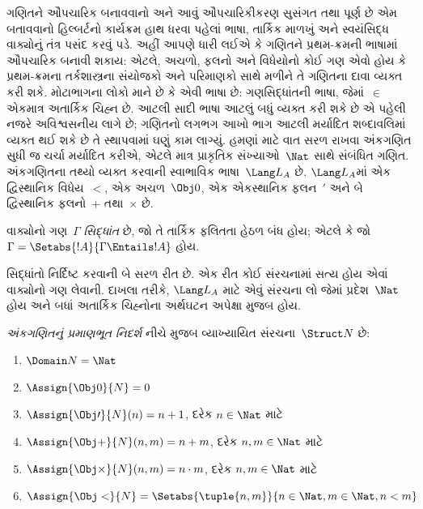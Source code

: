\label{guunit:OLP-0277}


ગણિતને ઔપચારિક બનાવવાનો અને આવું ઔપચારિકીકરણ
સુસંગત તથા પૂર્ણ છે એમ બતાવવાનો હિલ્બર્ટનો
કાર્યક્રમ હાથ ધરવા પહેલાં ભાષા, તાર્કિક માળખું
અને સ્વયંસિદ્ધ વાક્યોનું તંત્ર પસંદ કરવું પડે.
અહીં આપણે ધારી લઈએ કે ગણિતને પ્રથમ-ક્રમની
ભાષામાં ઔપચારિક બનાવી શકાય: એટલે, અચળો,
ફલનો અને વિધેયોનો કોઈ ગણ એવો
હોય કે પ્રથમ-ક્રમના તર્કશાસ્ત્રના સંયોજકો અને
પરિમાણકો સાથે મળીને તે ગણિતના દાવા વ્યક્ત
કરી શકે. મોટાભાગના લોકો માને છે કે એવી ભાષા
છે: ગણસિદ્ધાંતની ભાષા, જેમાં~$\in$ એકમાત્ર
અતાર્કિક ચિહ્ન છે. આટલી સાદી ભાષા આટલું બધું
વ્યક્ત કરી શકે છે એ પહેલી નજરે અવિશ્વસનીય
લાગે છે; ગણિતનો લગભગ આખો ભાગ આટલી
મર્યાદિત શબ્દાવલિમાં વ્યક્ત થઈ શકે છે તે
સ્થાપવામાં ઘણું કામ લાગ્યું. હમણાં માટે વાત
સરળ રાખવા અંકગણિત સુધી જ ચર્ચા મર્યાદિત
કરીએ, એટલે માત્ર પ્રાકૃતિક સંખ્યાઓ~$\Nat$
સાથે સંબંધિત ગણિત. અંકગણિતના તથ્યો વ્યક્ત
કરવાની સ્વાભાવિક ભાષા~$\Lang L_A$ છે. $\Lang L_A$માં
એક દ્વિસ્થાનિક વિધેય~$<$, એક
અચળ~$\Obj 0$, એક એકસ્થાનિક
ફલન~$\prime$ અને બે દ્વિસ્થાનિક
ફલનો~$+$ તથા~$\times$ છે.

\begin{defn}
વાક્યોનો ગણ~$\Gamma$ \emph{સિદ્ધાંત} છે, જો
તે તાર્કિક ફલિતતા હેઠળ બંધ હોય; એટલે કે જો
$\Gamma = \Setabs{!A}{\Gamma \Entails
!A}$ હોય.
\end{defn}

સિદ્ધાંતો નિર્દિષ્ટ કરવાની બે સરળ રીત છે. એક
રીત કોઈ સંરચનામાં સત્ય હોય એવાં
વાક્યોનો ગણ લેવાની. દાખલા તરીકે,
$\Lang L_A$ માટે એવું સંરચના લો જેમાં
પ્રદેશ~$\Nat$ હોય અને બધાં અતાર્કિક
ચિહ્નોના અર્થઘટન અપેક્ષા મુજબ હોય.

\begin{defn}
\emph{અંકગણિતનું પ્રમાણભૂત નિદર્શ} નીચે મુજબ
વ્યાખ્યાયિત સંરચના~$\Struct N$ છે:
\begin{enumerate}
\item $\Domain N = \Nat$
\item $\Assign{\Obj 0}{N} = 0$
\item $\Assign{\Obj \prime}{N}(n) = n + 1$, દરેક $n \in \Nat$ માટે
\item $\Assign{\Obj +}{N}(n, m) = n + m$, દરેક $n, m \in \Nat$ માટે
\item $\Assign{\Obj \times}{N}(n, m) = n\cdot m$, દરેક $n, m \in \Nat$ માટે
\item $\Assign{\Obj <}{N} = \Setabs{\tuple{n, m}}{n \in \Nat, m \in
  \Nat, n < m}$
\end{enumerate}
\end{defn}

